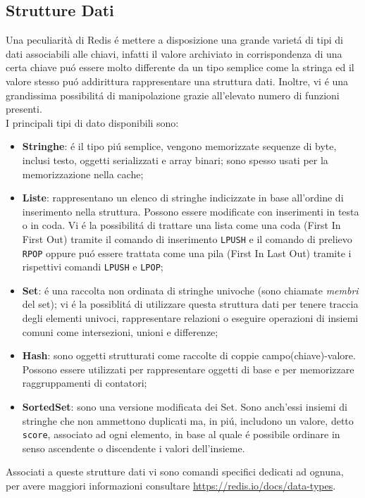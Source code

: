 \subsection{Strutture Dati}
Una peculiarità di Redis é mettere a disposizione una grande varietá di tipi di dati associabili alle chiavi, infatti il valore archiviato
in corrispondenza di una certa chiave puó essere molto differente da un tipo semplice come la stringa ed il valore stesso puó addirittura
rappresentare una struttura dati. Inoltre, vi é una grandissima possibilitá di manipolazione grazie all'elevato numero di funzioni presenti.\\
I principali tipi di dato disponibili sono:
\begin{itemize}
    \item \textbf{Stringhe}: é il tipo piú semplice, vengono memorizzate sequenze di byte, inclusi testo, oggetti serializzati e array binari;
    sono spesso usati per la memorizzazione nella cache;
    \item \textbf{Liste}: rappresentano un elenco di stringhe indicizzate in base all'ordine di inserimento nella struttura. Possono essere
    modificate con inserimenti in testa o in coda. Vi é la possibilitá di trattare una lista come una coda (First In First Out) tramite il comando di inserimento
    \texttt{LPUSH} e il comando di prelievo \texttt{RPOP} oppure puó essere trattata come una pila (First In Last Out) tramite i rispettivi comandi 
    \texttt{LPUSH} e \texttt{LPOP};
    \item \textbf{Set}: é una raccolta non ordinata di stringhe univoche (sono chiamate \emph{membri} del set); vi é la possiblitá
    di utilizzare questa struttura dati per tenere traccia degli elementi univoci, rappresentare relazioni o eseguire operazioni di insiemi
    comuni come intersezioni, unioni e differenze;
    \item \textbf{Hash}: sono oggetti strutturati come raccolte di coppie campo(chiave)-valore. Possono essere utilizzati per rappresentare oggetti
    di base e per memorizzare raggruppamenti di contatori;
    \item \textbf{SortedSet}: sono una versione modificata dei Set. Sono anch'essi insiemi di stringhe che non ammettono duplicati ma, in piú,
    includono un valore, detto \texttt{score}, associato ad ogni elemento, in base al quale é possibile ordinare in senso ascendente o discendente i valori
    dell'insieme.
\end{itemize}
    Associati a queste strutture dati vi sono comandi specifici dedicati ad ognuna, per avere maggiori informazioni consultare
    \url{https://redis.io/docs/data-types}.

